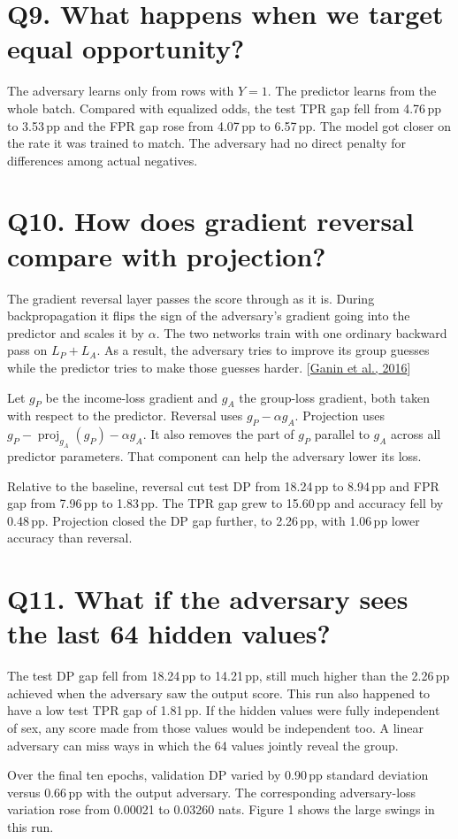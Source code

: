 \documentclass[11pt,letterpaper]{article}
\newcommand{\gap}[1]{#1\,pp}
\newcommand{\question}[2]{\section*{Q#1. #2}}
\begin{document}
\question{9}{What happens when we target equal opportunity?}

The adversary learns only from rows with \(Y=1\). The predictor learns from the whole batch. Compared with equalized odds, the test TPR gap fell from \gap{4.76} to \gap{3.53} and the FPR gap rose from \gap{4.07} to \gap{6.57}. The model got closer on the rate it was trained to match. The adversary had no direct penalty for differences among actual negatives.

\newpage
\question{10}{How does gradient reversal compare with projection?}

The gradient reversal layer passes the score through as it is. During backpropagation it flips the sign of the adversary's gradient going into the predictor and scales it by \(\alpha\). The two networks train with one ordinary backward pass on \(L_P+L_A\). As a result, the adversary tries to improve its group guesses while the predictor tries to make those guesses harder. [\href{https://jmlr.csail.mit.edu/papers/v17/15-239.html}{Ganin et al., 2016}]

Let \(g_P\) be the income-loss gradient and \(g_A\) the group-loss gradient, both taken with respect to the predictor. Reversal uses \(g_P-\alpha g_A\). Projection uses \(g_P-\operatorname{proj}_{g_A}(g_P)-\alpha g_A\). It also removes the part of \(g_P\) parallel to \(g_A\) across all predictor parameters. That component can help the adversary lower its loss.

Relative to the baseline, reversal cut test DP from \gap{18.24} to \gap{8.94} and FPR gap from \gap{7.96} to \gap{1.83}. The TPR gap grew to \gap{15.60} and accuracy fell by \gap{0.48}. Projection closed the DP gap further, to \gap{2.26}, with \gap{1.06} lower accuracy than reversal.

\question{11}{What if the adversary sees the last 64 hidden values?}

The test DP gap fell from \gap{18.24} to \gap{14.21}, still much higher than the \gap{2.26} achieved when the adversary saw the output score. This run also happened to have a low test TPR gap of \gap{1.81}. If the hidden values were fully independent of sex, any score made from those values would be independent too. A linear adversary can miss ways in which the 64 values jointly reveal the group.

Over the final ten epochs, validation DP varied by \gap{0.90} standard deviation versus \gap{0.66} with the output adversary. The corresponding adversary-loss variation rose from 0.00021 to 0.03260 nats. Figure 1 shows the large swings in this run.
\end{document}
